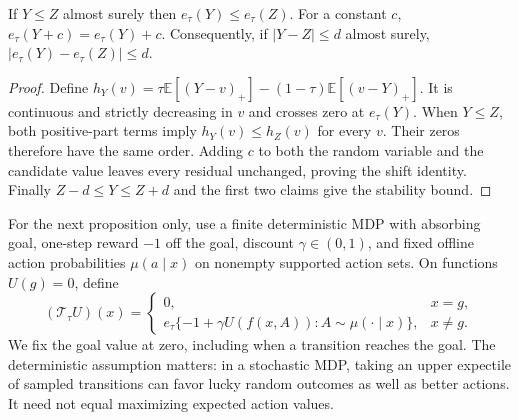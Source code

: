 \documentclass{article} %
\newcommand{\EE}{\mathbb E}
\theoremstyle{definition}
\theoremstyle{remark}
\begin{document}
\begin{lemma}
\label{lem:expectile}
If $Y\le Z$ almost surely then $e_\tau(Y)\le e_\tau(Z)$.
For a constant $c$, $e_\tau(Y+c)=e_\tau(Y)+c$.
Consequently, if $|Y-Z|\le d$ almost surely,
$|e_\tau(Y)-e_\tau(Z)|\le d$.
\end{lemma}
\begin{proof}
Define
$h_Y(v)=\tau\EE[(Y-v)_+]-(1-\tau)\EE[(v-Y)_+]$.
It is continuous and strictly decreasing in $v$ and crosses zero at $e_\tau(Y)$.
When $Y\le Z$, both positive-part terms imply $h_Y(v)\le h_Z(v)$ for every $v$.
Their zeros therefore have the same order. Adding $c$ to both the random variable
and the candidate value leaves every residual unchanged, proving the shift identity.
Finally $Z-d\le Y\le Z+d$ and the first two claims give the stability bound.
\end{proof}

For the next proposition only, use a finite deterministic MDP with absorbing goal,
one-step reward $-1$ off the goal, discount $\gamma\in(0,1)$, and fixed offline action
probabilities $\mu(a\mid x)$ on nonempty supported action sets.
On functions $U(g)=0$, define
\begin{equation}
 (\mathcal T_\tau U)(x)=
 \begin{cases}
  0,&x=g,\\
  e_\tau\{-1+\gamma U(f(x,A)):A\sim\mu(\cdot\mid x)\},&x\ne g .
 \end{cases}
 \label{eq:expectile-operator}
\end{equation}
We fix the goal value at zero, including when a transition reaches the goal.
The deterministic assumption matters: in a stochastic MDP, taking an upper expectile
of sampled transitions can favor lucky random outcomes as well as better actions.
It need not equal maximizing expected action values.
\end{document}
